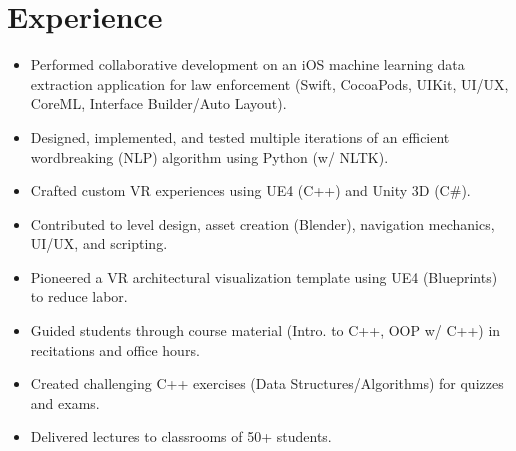 \documentclass[]{deedy_resume}
\begin{document}
\hfill
\begin{minipage}[t]{0.63\textwidth} 


\section{Experience}
\begin{itemize}[noitemsep,topsep=0pt]
\item Performed collaborative development on an iOS machine learning data extraction application for law enforcement (Swift, CocoaPods, UIKit, UI/UX, CoreML, Interface Builder/Auto Layout).
\item Designed, implemented, and tested multiple iterations of an efficient wordbreaking (NLP) algorithm using Python (w/ NLTK).
\end{itemize}
\vspace{3mm}

\begin{itemize}[noitemsep,topsep=0pt]
\item Crafted custom VR experiences using UE4 (C++) and Unity 3D (C\#).
\item Contributed to level design, asset creation (Blender), navigation mechanics, UI/UX, and scripting.
\item Pioneered a VR architectural visualization template using UE4 (Blueprints) to reduce labor.
\end{itemize}
\vspace{3mm}

\begin{itemize}[noitemsep,topsep=0pt]
\itemsep0em 
\item Guided students through course material (Intro. to C++, OOP w/ C++) in recitations and office hours.
\item Created challenging C++ exercises (Data Structures/Algorithms) for quizzes and exams.
\item Delivered lectures to classrooms of 50+ students.
\end{itemize}
\sectionsep


\end{minipage}
\end{document}
